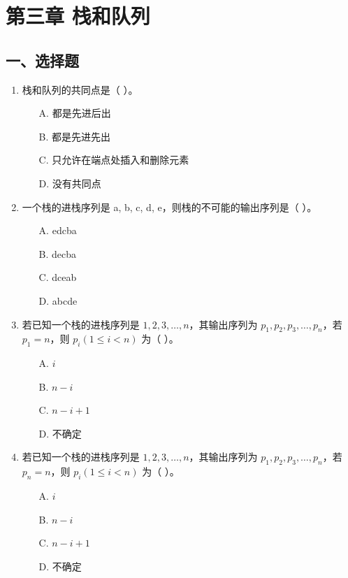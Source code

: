 \documentclass[12pt, a4paper]{article}
\begin{document}
\section{第三章 栈和队列}

\subsection*{一、选择题}
\begin{enumerate}
    \item 栈和队列的共同点是（ ）。
    \begin{enumerate}
        \item[A.] 都是先进后出
        \item[B.] 都是先进先出
        \item[C.] 只允许在端点处插入和删除元素
        \item[D.] 没有共同点
    \end{enumerate}
    
    \item 一个栈的进栈序列是 a, b, c, d, e，则栈的不可能的输出序列是（ ）。
    \begin{enumerate}
        \item[A.] edcba
        \item[B.] decba
        \item[C.] dceab
        \item[D.] abcde
    \end{enumerate}
    
    \item 若已知一个栈的进栈序列是 $1, 2, 3, \dots, n$，其输出序列为 $p_1, p_2, p_3, \dots, p_n$，若 $p_1=n$，则 $p_i (1 \le i < n)$ 为（ ）。
    \begin{enumerate}
        \item[A.] $i$
        \item[B.] $n-i$
        \item[C.] $n-i+1$
        \item[D.] 不确定
    \end{enumerate}
    
    \item 若已知一个栈的进栈序列是 $1, 2, 3, \dots, n$，其输出序列为 $p_1, p_2, p_3, \dots, p_n$，若 $p_n=n$，则 $p_i (1 \le i < n)$ 为（ ）。
    \begin{enumerate}
        \item[A.] $i$
        \item[B.] $n-i$
        \item[C.] $n-i+1$
        \item[D.] 不确定
    \end{enumerate}
    

\end{enumerate}
\end{document}
